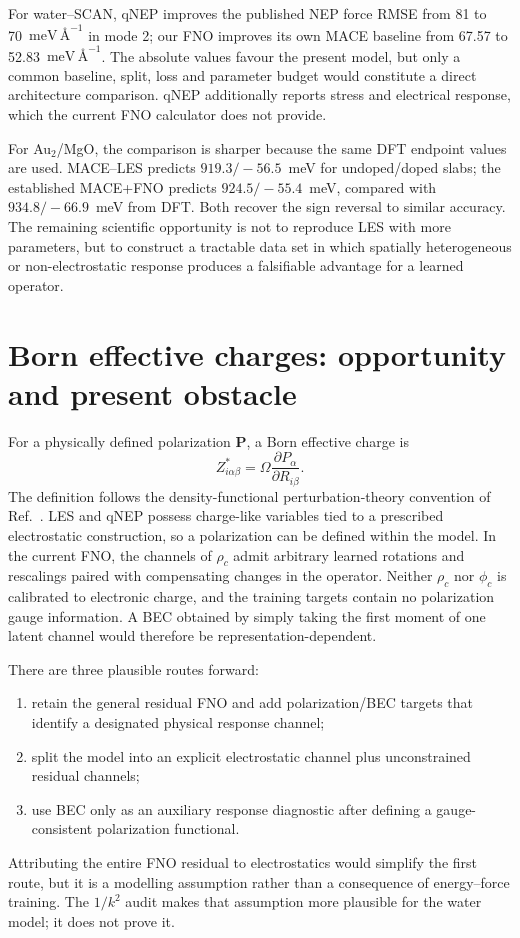 \documentclass[11pt]{article}
\newcommand{\meva}{\ensuremath{\mathrm{meV\,\text{\AA}^{-1}}}}
\begin{document}
For water--SCAN, qNEP improves the published NEP force RMSE from 81 to
70~\meva{} in mode 2; our FNO improves its own MACE baseline from 67.57 to
52.83~\meva. The absolute values favour the present model, but only a common
baseline, split, loss and parameter budget would constitute a direct
architecture comparison. qNEP additionally reports stress and electrical
response, which the current FNO calculator does not provide.

For Au$_2$/MgO, the comparison is sharper because the same DFT endpoint values
are used. MACE--LES predicts \(919.3/-56.5\)~meV for undoped/doped slabs; the
established MACE+FNO predicts \(924.5/-55.4\)~meV, compared with
\(934.8/-66.9\)~meV from DFT. Both recover the sign reversal to similar
accuracy. The remaining scientific opportunity is not to reproduce LES with
more parameters, but to construct a tractable data set in which spatially
heterogeneous or non-electrostatic response produces a falsifiable advantage
for a learned operator.

\section{Born effective charges: opportunity and present obstacle}

For a physically defined polarization \(\mathbf P\), a Born effective charge
is
\begin{equation}
 Z^{*}_{i\alpha\beta}
 =\Omega\frac{\partial P_\alpha}{\partial R_{i\beta}}.
\end{equation}
The definition follows the density-functional perturbation-theory convention
of Ref.~\citep{gonze1997bec}.
LES and qNEP possess charge-like variables tied to a prescribed electrostatic
construction, so a polarization can be defined within the model. In the
current FNO, the channels of \(\rho_c\) admit arbitrary learned rotations and
rescalings paired with compensating changes in the operator. Neither
\(\rho_c\) nor \(\phi_c\) is calibrated to electronic charge, and the training
targets contain no polarization gauge information. A BEC obtained by simply
taking the first moment of one latent channel would therefore be
representation-dependent.

There are three plausible routes forward:
\begin{enumerate}
 \item retain the general residual FNO and add polarization/BEC targets that
 identify a designated physical response channel;
 \item split the model into an explicit electrostatic channel plus
 unconstrained residual channels;
 \item use BEC only as an auxiliary response diagnostic after defining a
 gauge-consistent polarization functional.
\end{enumerate}
Attributing the entire FNO residual to electrostatics would simplify the first
route, but it is a modelling assumption rather than a consequence of
energy--force training. The \(1/k^2\) audit makes that assumption more
plausible for the water model; it does not prove it.
\end{document}
